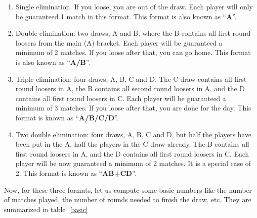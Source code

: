 \begin{enumerate}
\item
Single elimination. If you loose, you are out of the draw. 
Each player will only be guaranteed 1 match in this format.
\newline
This format is also known as ``{\bf A}''.

\item
Double elimination: two draws, A and B, 
where the B contains all first round loosers from the main (A) bracket.
Each player will be guaranteed a minimum of 2 matches.
If you loose after that, you can go home.
\newline
This format is also known as ``{\bf A/B}''.

\item
Triple elimination: four draws, A, B, C and D. The C draw 
contains all first
round loosers in A, the B contains all second round loosers in A, and the 
D contains all first round loosers in C. 
Each player will be guaranteed a minimum of 3 matches.
If you loose after that, you are done for the day.
\newline
This format is known as ``{\bf A/B/C/D}''.


\item
Two double elimination: four draws, A, B, C and D, but half the
players have been put in the A, half the players in the C draw
already.
The B contains all first round loosers in A, and the 
D contains all first round loosers in C. 
Each player will be now guaranteed a minimum of 2 matches. It is
a special case of 2.
\newline
This format is known as ``{\bf AB+CD}''.


\end{enumerate}

Now, for these three formats, let us compute some basic numbers
like the number of matches played, the number of rounds needed
to finish the draw, etc. They are summarized in table~\ref{basic}

\newpage

